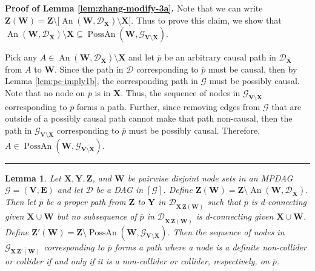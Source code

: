 \documentclass[11pt]{article}
\DeclareMathOperator{\An}{An}
\DeclareMathOperator{\PossAn}{PossAn}
\newcommand{\BlackBox}{\rule{1.5ex}{1.5ex}}  %
\newtheorem{lemma}[theorem]{Lemma}
\newcommand{\mb}[1]{\mathbf{#1}}
\newcommand{\g}[1][G]{\mathcal{#1}}
\newenvironment{proofof}[1][]{\noindent \textbf{Proof of #1.}}{\hfill\BlackBox}
\begin{document}
\begin{proofof}[Lemma \ref{lem:zhang-modify-3a}]
    Note that we can write $\mb{Z(W)} = \mb{Z} \setminus \big[ \An(\mb{W}, \g[D]_{\overline{\mb{X}}}) \setminus \mb{X} \big]$. Thus to prove this claim, we show that $\An(\mb{W}, \g[D]_{\overline{\mb{X}}}) \setminus \mb{X} \subseteq \PossAn(\mb{W}, \g_{\mb{V \setminus X}})$.
    
    Pick any $A \in \An(\mb{W}, \g[D]_{\overline{\mb{X}}}) \setminus \mb{X}$ and let $\overline{p}$ be an arbitrary causal path in $\g[D]_{\overline{\mb{X}}}$ from $A$ to $\mb{W}$. Since the path in $\g[D]$ corresponding to $\overline{p}$ must be causal, then by Lemma \ref{lem:pc-imply1b}, the corresponding path in $\g$ must be possibly causal. Note that no node on $\overline{p}$ is in $\mb{X}$. Thus, the sequence of nodes in $\g_{\mb{V \setminus X}}$ corresponding to $\overline{p}$ forms a path. Further, since removing edges from $\g$ that are outside of a possibly causal path cannot make that path non-causal, then the path in $\g_{\mb{V \setminus X}}$ corresponding to $\overline{p}$ must be possibly causal. Therefore, $A \in \PossAn(\mb{W}, \g_{\mb{V \setminus X}})$.
\end{proofof}



\begin{lemma}
\label{lem:zhang-modify-3b}
    Let $\mb{X,Y,Z}$, and $\mb{W}$ be pairwise disjoint node sets in an MPDAG $\g = (\mb{V,E})$ and let $\g[D]$ be a DAG in $[\g]$. Define $\mb{Z(W)} = \mb{Z} \setminus \An(\mb{W}, \g[D]_{\overline{\mb{X}}})$. Then let $\overline{p}$ be a proper path from $\mb{Z}$ to $\mb{Y}$ in $\g[D]_{\overline{\mb{X \, Z(W)}}}$ such that $\overline{p}$ is d-connecting given $\mb{X} \cup \mb{W}$ but no subsequence of $\overline{p}$ in $\g[D]_{\overline{\mb{X \, Z(W)}}}$ is d-connecting given $\mb{X} \cup \mb{W}$. Define $\mb{Z'(W)} = \mb{Z} \setminus \PossAn(\mb{W}, \g_{\mb{V \setminus X}})$. Then the sequence of nodes in $\g_{\overline{\mb{X \, Z'(W)}}}$ corresponding to $\overline{p}$ forms a path where a node is a definite non-collider or collider if and only if it is a non-collider or collider, respectively, on $\overline{p}$.
\end{lemma}
\end{document}
